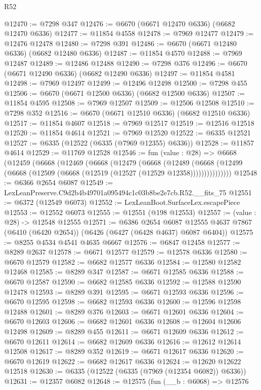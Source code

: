 \begin{lexlean}{R52}
\begin{coremodule}
@12470 := @7298 @347
@12476 := @6670 (@6671 @12470 @6336) (@6682 @12470 @6336)
@12477 := @11854 @4558
@12478 := @7969 @12477
@12479 := @12476 @12478
@12480 := @7298 @391
@12486 := @6670 (@6671 @12480 @6336) (@6682 @12480 @6336)
@12487 := @11854 @4570
@12488 := @7969 @12487
@12489 := @12486 @12488
@12490 := @7298 @376
@12496 := @6670 (@6671 @12490 @6336) (@6682 @12490 @6336)
@12497 := @11854 @4581
@12498 := @7969 @12497
@12499 := @12496 @12498
@12500 := @7298 @455
@12506 := @6670 (@6671 @12500 @6336) (@6682 @12500 @6336)
@12507 := @11854 @4595
@12508 := @7969 @12507
@12509 := @12506 @12508
@12510 := @7298 @352
@12516 := @6670 (@6671 @12510 @6336) (@6682 @12510 @6336)
@12517 := @11854 @4607
@12518 := @7969 @12517
@12519 := @12516 @12518
@12520 := @11854 @4614
@12521 := @7969 @12520
@12522 := @6335 @12521
@12527 := @6335 (@12522 (@6335 (@7969 @12355) @6336))
@12528 := @11857 @4614
@12529 := @11769 @12528
@12546 := fun (value : @28) =>
  @6668
    (@12459
      (@6668
        (@12469
          (@6668
            (@12479
              (@6668
                (@12489
                  (@6668 (@12499 (@6668 (@12509 (@6668 (@12519 (@12527 (@12529 @12358)))))))))))))))
@12548 := @6366 @2654 @6087
@12549 := LexLeanPreserve.C9d2b4b49701a095494c1c03b8be2e7cb.R52.__fits_75
@12551 := @6372 (@12549 @6073)
@12552 := LexLeanBoot.SurfaceLex.escapePiece
@12553 := @12552 @6073
@12555 := @12551 (@198 @12553)
@12557 := (value : @28) -> @12548 @12555
@12571 := @6386
    @2654
    @6087
    @12555
    @4637
    @7867
    (@6410 (@6420 @2654))
    (@6426 (@6427 (@6428 @4637) @6087 @6404))
@12575 := @8255 @4534 @4541 @4635 @6667
@12576 := @6847 @12458
@12577 := @8289 @2637
@12578 := @6671 @12577
@12579 := @12578 @6336
@12580 := @6670 @12579
@12582 := @6682 @12577 @6336
@12584 := @12580 @12582 @12468
@12585 := @8289 @347
@12587 := @6671 @12585 @6336
@12588 := @6670 @12587
@12590 := @6682 @12585 @6336
@12592 := @12588 @12590 @12478
@12593 := @8289 @391
@12595 := @6671 @12593 @6336
@12596 := @6670 @12595
@12598 := @6682 @12593 @6336
@12600 := @12596 @12598 @12488
@12601 := @8289 @376
@12603 := @6671 @12601 @6336
@12604 := @6670 @12603
@12606 := @6682 @12601 @6336
@12608 := @12604 @12606 @12498
@12609 := @8289 @455
@12611 := @6671 @12609 @6336
@12612 := @6670 @12611
@12614 := @6682 @12609 @6336
@12616 := @12612 @12614 @12508
@12617 := @8289 @352
@12619 := @6671 @12617 @6336
@12620 := @6670 @12619
@12622 := @6682 @12617 @6336
@12624 := @12620 @12622 @12518
@12630 := @6335 (@12522 (@6335 (@7969 (@12354 @6082)) @6336))
@12631 := @12357 @6082
@12648 := @12575
    (fun (__b : @6068) =>
    @12576

\end{coremodule}
\end{lexlean}
